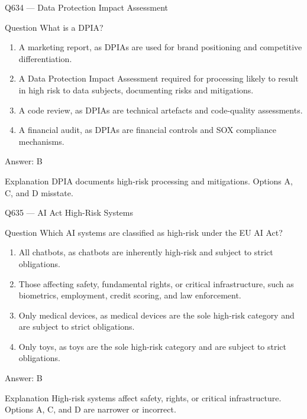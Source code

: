 \documentclass[aspectratio=169,8pt]{beamer}
\begin{document}
	\begin{frame}{Q634 --- Data Protection Impact Assessment}
		\begin{block}{Question}
			What is a DPIA?
			\begin{enumerate}
				\item A marketing report, as DPIAs are used for brand positioning and competitive differentiation.
				\item A Data Protection Impact Assessment required for processing likely to result in high risk to data subjects, documenting risks and mitigations.
				\item A code review, as DPIAs are technical artefacts and code-quality assessments.
				\item A financial audit, as DPIAs are financial controls and SOX compliance mechanisms.
			\end{enumerate}
		\end{block}
		\begin{exampleblock}{Answer: B}\end{exampleblock}
		\begin{block}{Explanation}
			DPIA documents high-risk processing and mitigations. Options A, C, and D misstate.
		\end{block}
	\end{frame}
	
	\begin{frame}{Q635 --- AI Act High-Risk Systems}
		\begin{block}{Question}
			Which AI systems are classified as high-risk under the EU AI Act?
			\begin{enumerate}
				\item All chatbots, as chatbots are inherently high-risk and subject to strict obligations.
				\item Those affecting safety, fundamental rights, or critical infrastructure, such as biometrics, employment, credit scoring, and law enforcement.
				\item Only medical devices, as medical devices are the sole high-risk category and are subject to strict obligations.
				\item Only toys, as toys are the sole high-risk category and are subject to strict obligations.
			\end{enumerate}
		\end{block}
		\begin{exampleblock}{Answer: B}\end{exampleblock}
		\begin{block}{Explanation}
			High-risk systems affect safety, rights, or critical infrastructure. Options A, C, and D are narrower or incorrect.
		\end{block}
	\end{frame}
	
\end{document}
